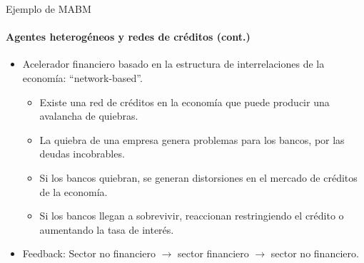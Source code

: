 \documentclass[11pt]{beamer}
\begin{document}
\begin{frame}{Ejemplo de MABM}
\framesubtitle{Agentes heterogéneos y redes de créditos (cont.)}
\begin{itemize}
    \item Acelerador financiero basado en la estructura de interrelaciones de la economía: ``network-based''.
    \begin{itemize}
        \item Existe una red de créditos en la economía que puede producir una avalancha de quiebras.
        \item La quiebra de una empresa genera problemas para los bancos, por las deudas incobrables. 
        \item Si los bancos quiebran, se generan distorsiones en el mercado de créditos de la economía.
        \item Si los bancos llegan a sobrevivir, reaccionan restringiendo el crédito o aumentando la tasa de interés.
    \end{itemize}
    \item Feedback: Sector no financiero $\rightarrow$ sector financiero $\rightarrow$ sector no financiero.
\end{itemize}
\end{frame}
\end{document}
